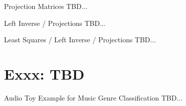 \documentclass[mathserif, aspectratio=43]{intbeamer}
\begin{document}
\begin{frame}{Projection Matrices}
TBD...
\end{frame}

\begin{frame}{Left Inverse / Projections}
TBD...
\end{frame}

\begin{frame}{Least Squares / Left Inverse / Projections}
TBD...
\end{frame}

\section{Exxx: TBD}
\begin{frame}{Audio Toy Example for Music Genre Classification}
TBD...
\end{frame}




\end{document}
